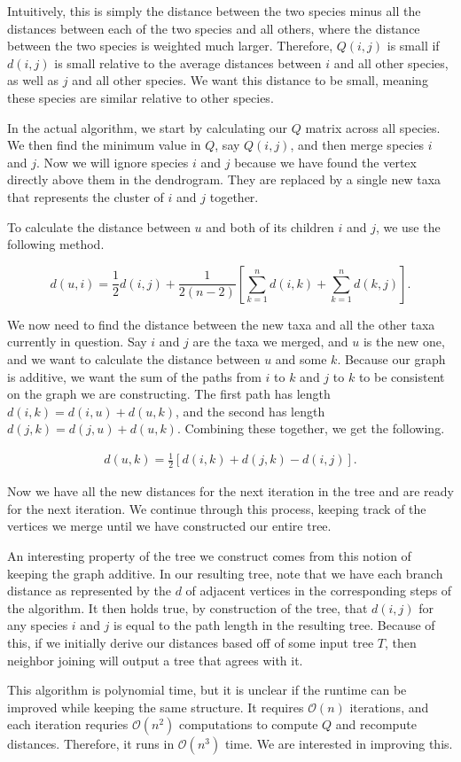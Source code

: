 Intuitively, this is simply the distance between the two species minus all the distances between each of the two species and all others, where the distance between the two species is weighted much larger. Therefore, $Q(i,j)$ is small if $d(i,j)$ is small relative to the average distances between $i$ and all other species, as well as $j$ and all other species. We want this distance to be small, meaning these species are similar relative to other species.

In the actual algorithm, we start by calculating our $Q$ matrix across all species. We then find the minimum value in $Q$, say $Q(i,j)$, and then merge species $i$ and $j$. Now we will ignore species $i$ and $j$ because we have found the vertex directly above them in the dendrogram. They are replaced by a single new taxa that represents the cluster of $i$ and $j$ together.

To calculate the distance between $u$ and both of its children $i$ and $j$, we use the following method.

\[d(u,i) = \frac12d(i,j) + \frac1{2(n-2)} \left[\sum_{k=1}^n d(i,k) + \sum_{k=1}^n d(k,j)\right].\]

We now need to find the distance between the new taxa and all the other taxa currently in question. Say $i$ and $j$ are the taxa we merged, and $u$ is the new one, and we want to calculate the distance between $u$ and some $k$. Because our graph is additive, we want the sum of the paths from $i$ to $k$ and $j$ to $k$ to be consistent on the graph we are constructing. The first path has length $d(i,k) = d(i,u) + d(u,k)$, and the second has length $d(j,k) = d(j,u) + d(u,k)$. Combining these together, we get the following.

\begin{align}\label{distances}
d(u,k) = \frac12[d(i,k) + d(j,k) - d(i,j)].
\end{align}

Now we have all the new distances for the next iteration in the tree and are ready for the next iteration. We continue through this process, keeping track of the vertices we merge until we have constructed our entire tree.

An interesting property of the tree we construct comes from this notion of keeping the graph additive. In our resulting tree, note that we have each branch distance as represented by the $d$ of adjacent vertices in the corresponding steps of the algorithm. It then holds true, by construction of the tree, that $d(i,j)$ for any species $i$ and $j$ is equal to the path length in the resulting tree. Because of this, if we initially derive our distances based off of some input tree $T$, then neighbor joining will output a tree that agrees with it.

This algorithm is polynomial time, but it is unclear if the runtime can be improved while keeping the same structure. It requires $\mathcal{O}(n)$ iterations, and each iteration requries $\mathcal{O}(n^2)$ computations to compute $Q$ and recompute distances. Therefore, it runs in $\mathcal{O}(n^3)$ time. We are interested in improving this.


